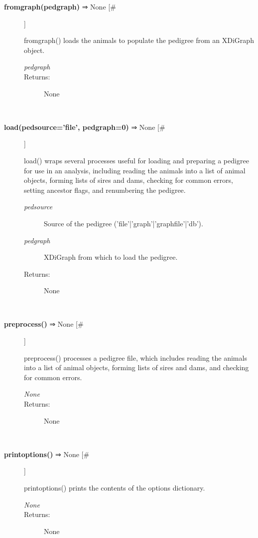 \begin{description}
\item[\textbf{fromgraph(pedgraph)} ⇒ None [\#]
]
\par fromgraph() loads the animals to populate the pedigree from an
XDiGraph object.
\begin{description}
\item[\textit{pedgraph}
]

\item[Returns:
]
None
\end{description}\\

\item[\textbf{load(pedsource='file', pedgraph=0)} ⇒ None [\#]
]
\par load() wraps several processes useful for loading and preparing a pedigree for
use in an analysis, including reading the animals into a list of animal objects,
forming lists of sires and dams, checking for common errors, setting ancestor
flags, and renumbering the pedigree.
\begin{description}
\item[\textit{pedsource}
]
Source of the pedigree ('file'|'graph'|'graphfile'|'db').
\item[\textit{pedgraph}
]
XDiGraph from which to load the pedigree.
\item[Returns:
]
None
\end{description}\\

\item[\textbf{preprocess()} ⇒ None [\#]
]
\par preprocess() processes a pedigree file, which includes reading the animals
into a list of animal objects, forming lists of sires and dams, and checking for
common errors.
\begin{description}
\item[\textit{None}
]

\item[Returns:
]
None
\end{description}\\

\item[\textbf{printoptions()} ⇒ None [\#]
]
\par printoptions() prints the contents of the options dictionary.
\begin{description}
\item[\textit{None}
]

\item[Returns:
]
None
\end{description}\\


\end{description}
